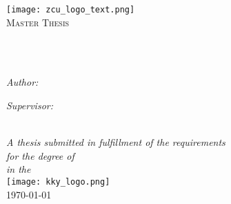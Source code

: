 \frontmatter %

\pagestyle{plain} %


\begin{titlepage}
\begin{center}
\texttt{[image: zcu\_logo\_text.png]} %
\\\vspace{3cm}
\textsc{\Large Master Thesis}\\[0.2cm] 	 %

\HRule \\[0.4cm] %
{\huge \bfseries \ttitle\par}\vspace{0.4cm} %
\HRule \\[1.5cm] %
 
\begin{minipage}[t]{0.45\textwidth}
\begin{flushleft} \large
\emph{Author:}\\
\href{http://www.kitt.evee.cz}{\authorname}
\end{flushleft}
\end{minipage}
\begin{minipage}[t]{0.45\textwidth}
\begin{flushright} \large
\emph{Supervisor:} \\
\href{http://www.kky.zcu.cz/cs/people/smidl-lubos}{\supname}
\end{flushright}
\end{minipage}\\[2.5cm]
 
\large \textit{A thesis submitted in fulfillment of the requirements\\ for the degree of \degreename}\\[0.3cm] %
\textit{in the}\\[0.4cm]
\texttt{[image: kky\_logo.png]} 				%
 \\\vspace{2cm}
{\large \today} %
 
\vfill
\end{center}
\end{titlepage}
